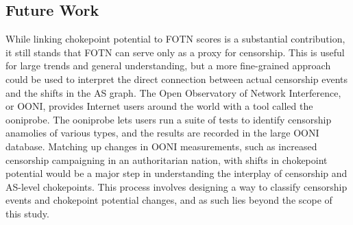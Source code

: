\documentclass[10pt, conference, letterpaper]{IEEEtran}
\begin{document}
\subsection{Future Work}
While linking chokepoint potential to FOTN scores is a substantial contribution, it still stands that FOTN can serve only as a proxy for censorship.
This is useful for large trends and general understanding, but a more fine-grained approach could be used to interpret the direct connection between
actual censorship events and the shifts in the AS graph. The Open Observatory of Network Interference, or OONI, \cite{OONI} provides Internet users around
the world with a tool called the ooniprobe. The ooniprobe lets users run a suite of tests to identify censorship anamolies of various types, and the results are
recorded in the large OONI database. Matching up changes in OONI measurements, such as increased censorship campaigning in an authoritarian nation, with shifts
in chokepoint potential would be a major step in understanding the interplay of censorship and AS-level chokepoints. This process involves designing a way to classify
censorship events and chokepoint potential changes, and as such lies beyond the scope of this study.



\end{document}

